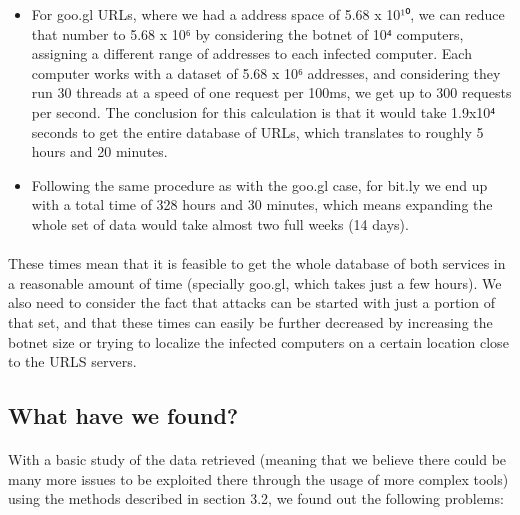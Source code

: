 \documentclass[12pt]{article}
\begin{document}
\begin{itemize}

\item  For goo.gl URLs, where we had a address space of 5.68 x 10¹⁰, we can reduce that number to 5.68 x 10⁶ by considering the botnet of 10⁴ computers, assigning a different range of addresses to each infected computer. Each computer works with a dataset of 5.68 x 10⁶ addresses, and considering they run 30 threads at a speed of one request per 100ms, we get up to 300 requests per second. The conclusion for this calculation is that it would take 1.9x10⁴ seconds to get the entire database of URLs, which translates to roughly 5 hours and 20 minutes.

\item  Following the same procedure as with the goo.gl case, for bit.ly we end up with a total time of 328 hours and 30 minutes, which means expanding the whole set of data would take almost two full weeks (14 days).

\end{itemize}

\paragraph{}
These times mean that it is feasible to get the whole database of both services in a reasonable amount of time (specially goo.gl, which takes just a few hours). We also need to consider the fact that attacks can be started with just a portion of that set, and that these times can easily be further decreased by increasing the botnet size or trying to localize the infected computers on a certain location close to the URLS servers.

\subsection{What have we found?}

\paragraph{}
With a basic study of the data retrieved (meaning that we believe there could be many more issues to be exploited there through the usage of more complex tools) using the methods described in section 3.2, we found out the following problems:
\end{document}
